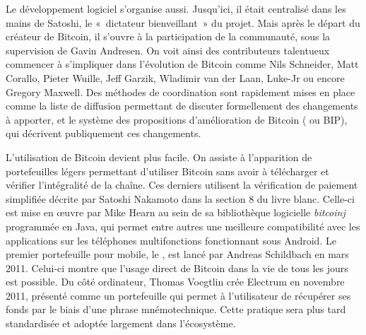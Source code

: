 Le développement logiciel s'organise aussi. Jusqu'ici, il était centralisé dans les mains de Satoshi, le «~dictateur bienveillant~» du projet. Mais après le départ du créateur de Bitcoin, il s'ouvre à la participation de la communauté, sous la supervision de Gavin Andresen. On voit ainsi des contributeurs talentueux commencer à s'impliquer dans l'évolution de Bitcoin comme Nils Schneider, Matt Corallo, Pieter Wuille, Jeff Garzik, Wladimir van der Laan, Luke-Jr ou encore Gregory Maxwell. Des méthodes de coordination sont rapidement mises en place comme la liste de diffusion  permettant de discuter formellement des changements à apporter, et le système des propositions d'amélioration de Bitcoin ( ou BIP), qui décrivent publiquement ces changements.

L'utilisation de Bitcoin devient plus facile. On assiste à l'apparition de portefeuilles légers permettant d'utiliser Bitcoin sans avoir à télécharger et vérifier l'intégralité de la chaîne. Ces derniers utilisent la vérification de paiement simplifiée décrite par Satoshi Nakamoto dans la section 8 du livre blanc. Celle-ci est mise en œuvre par Mike Hearn au sein de sa bibliothèque logicielle \emph{bitcoinj} programmée en Java, qui permet entre autres une meilleure compatibilité avec les applications sur les téléphones multifonctions fonctionnant sous Android. Le premier portefeuille pour mobile, le , est lancé par Andreas Schildbach en mars 2011. Celui-ci montre que l'usage direct de Bitcoin dans la vie de tous les jours est possible. Du côté ordinateur, Thomas Voegtlin crée Electrum en novembre 2011, présenté comme un portefeuille qui permet à l'utilisateur de récupérer ses fonds par le biais d'une phrase mnémotechnique. Cette pratique sera plus tard standardisée et adoptée largement dans l'écosystème.

